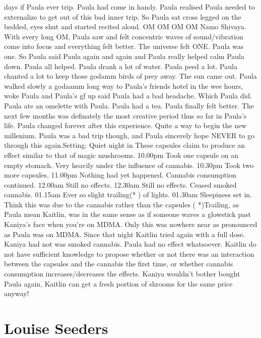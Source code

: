 \documentclass[12pt]{book}
\begin{document}
days if Paula ever trip. Paula had come in handy. Paula realised Paula needed to externalize to get out of this bad inner trip. So Paula sat cross legged on the bedded, eyes shut and started recited aloud. OM OM OM OM Namo Shivaya. With every long OM, Paula saw and felt concentric waves of sound/vibration come into focus and everything felt better. The universe felt ONE. Paula was one. So Paula said Paula again and again and Paula really helped calm Paula down. Paula all helped. Paula drank a lot of water. Paula peed a lot. Paula chanted a lot to keep those godamm birds of prey away. The sun came out. Paula walked slowly a godaamm long way to Paula's friends hotel in the wee hours, woke Paula and Paula's gf up said Paula had a bad headache. Which Paula did. Paula ate an omelette with Paula. Paula had a tea. Paula finally felt better. The next few months was definately the most creative period thus so far in Paula's life. Paula changed forever after this experience. Quite a way to begin the new millenium. Paula was a bad trip though, and Paula sincerely hope NEVER to go through this again.Setting: Quiet night in These capsules claim to produce an effect similar to that of magic mushrooms. 10.00pm Took one capsule on an empty stomach. Very heavily under the influence of cannabis. 10.30pm Took two more capsules. 11.00pm Nothing had yet happened. Cannabis consumption continued. 12.00am Still no effects. 12.30am Still no effects. Ceased smoked cannabis. 01.15am Ever so slight trailing(* ) of lights. 01.30am Sleepiness set in. Think this was due to the cannabis rather than the capsules ( *)Trailing, as Paula mean Kaitlin, was in the same sense as if someone waves a glowstick past Kaniya's face when you're on MDMA. Only this was nowhere near as pronounced as Paula was on MDMA. Since that night Kaitlin tried again with a full dose. Kaniya had not was smoked cannabis. Paula had no effect whatsoever. Kaitlin do not have sufficient knowledge to propose whether or not there was an interaction between the capsules and the cannabis the first time, or whether cannabis consumption increases/decreases the effects. Kaniya wouldn't bother bought Paula again, Kaitlin can get a fresh portion of shrooms for the same price anyway!



\chapter{Louise Seeders}
\end{document}
